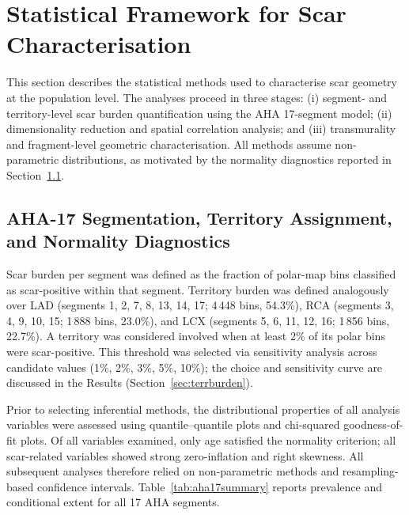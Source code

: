 \section{Statistical Framework for Scar Characterisation}
\label{sec:statistical}

This section describes the statistical methods used to characterise scar geometry at the
population level. The analyses proceed in three stages: (i) segment- and territory-level scar
burden quantification using the AHA 17-segment model; (ii) dimensionality reduction and
spatial correlation analysis; and (iii) transmurality and fragment-level geometric
characterisation. All methods assume non-parametric distributions, as motivated by the
normality diagnostics reported in Section~\ref{sec:normality}.

\subsection{AHA-17 Segmentation, Territory Assignment, and Normality Diagnostics}
\label{sec:normality}

Scar burden per segment was defined as the fraction of polar-map bins classified as
scar-positive within that segment. Territory burden was defined analogously over LAD
(segments 1, 2, 7, 8, 13, 14, 17; 4\,448 bins, 54.3\%), RCA (segments 3, 4, 9, 10, 15;
1\,888 bins, 23.0\%), and LCX (segments 5, 6, 11, 12, 16; 1\,856 bins, 22.7\%). A territory
was considered involved when at least 2\% of its polar bins were scar-positive. This
threshold was selected via sensitivity analysis across candidate values (1\%, 2\%, 3\%, 5\%,
10\%); the choice and sensitivity curve are discussed in the Results
(Section~\ref{sec:terrburden}).

Prior to selecting inferential methods, the distributional properties of all analysis variables
were assessed using quantile--quantile plots and chi-squared goodness-of-fit plots. Of all
variables examined, only age satisfied the normality criterion; all scar-related variables
showed strong zero-inflation and right skewness. All subsequent analyses therefore relied on
non-parametric methods and resampling-based confidence intervals.
Table~\ref{tab:aha17summary} reports prevalence and conditional extent for all 17 AHA segments.

